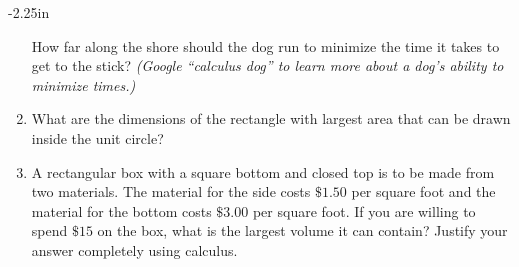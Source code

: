 \begin{adjustwidth*}{}{-2.25in}
\begin{multicols*}{2}
\begin{enumerate}[1),resume]
How far along the shore should the dog run to minimize the time it takes to get to the stick? \textit{(Google ``calculus dog'' to learn more about a dog's ability to minimize times.)}

\item What are the dimensions of the rectangle with largest area that can be drawn inside the unit circle?

	\item A rectangular box with a square bottom and closed top is to be made from two materials.  The material for the side costs $\$1.50$ per square foot and the material for the bottom costs $\$3.00$ per square foot.  If you are willing to spend $\$15$ on the box, what is the largest volume it can contain?  Justify your answer completely using calculus.

\end{enumerate}

\end{multicols*}
\end{adjustwidth*}

\clearpage

